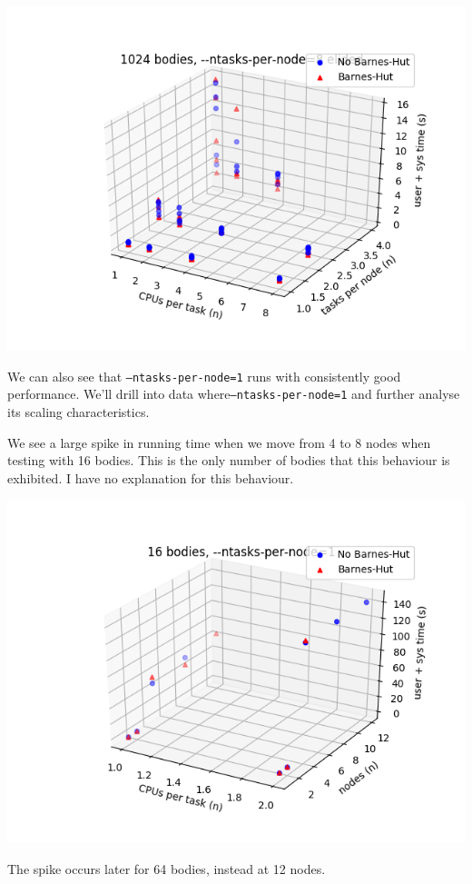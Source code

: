 \documentclass[11pt,a4paper]{article}
\begin{document}
\includegraphics[width=14.2cm]{1024-cpusPerTask-tasksPerNode-elide_8_tpn}

We can also see that \texttt{--ntasks-per-node=1} runs with consistently good performance. We'll drill into data where\texttt{--ntasks-per-node=1} and further analyse its scaling characteristics.

We see a large spike in running time when we move from 4 to 8 nodes when testing with 16 bodies. This is the only number of bodies that this behaviour is exhibited. I have no explanation for this behaviour.

\includegraphics[width=14.2cm]{16-cpusPerTask-nodes-just_1_tpn}

The spike occurs later for 64 bodies, instead at 12 nodes. 
\end{document}
